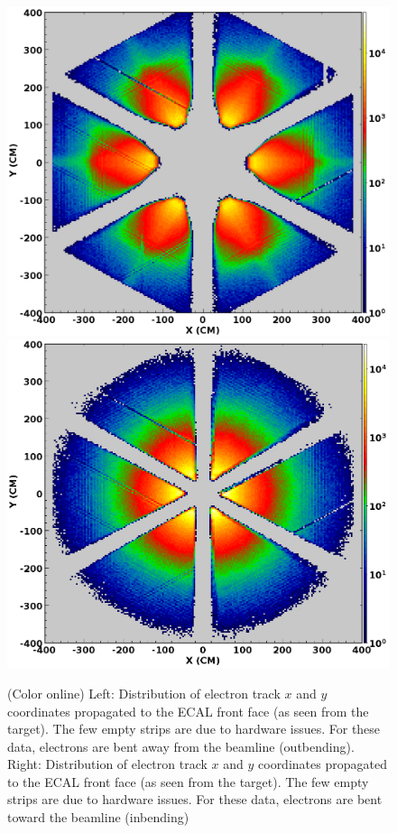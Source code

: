 \documentclass[final,3p,twocolumn]{elsarticle}
\begin{document}
\begin{figure}[ht!]
\centerline{\includegraphics[width=0.95\columnwidth]{e-outbending.png}
\hspace{1cm}\includegraphics[width=0.95\columnwidth]{e-inbending.png}}
\caption{(Color online) Left: Distribution of electron track $x$ and $y$ coordinates propagated to the ECAL front face (as seen from
  the target). The few empty strips are due to hardware issues. For these data, electrons are bent away from the
  beamline (outbending). Right: Distribution of electron track $x$ and $y$ coordinates propagated to the ECAL front face 
  (as seen from the target). The few empty strips are due to hardware issues. For these data, electrons are bent toward the
  beamline (inbending)} 
\label{electrons-xy}
\end{figure}
\end{document}
